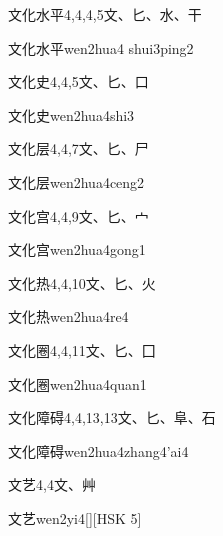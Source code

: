 \begin{entry}{文化水平}{4,4,4,5}{⽂、⼔、⽔、⼲}
  \begin{phonetics}{文化水平}{wen2hua4 shui3ping2}
  \end{phonetics}
\end{entry}

\begin{entry}{文化史}{4,4,5}{⽂、⼔、⼝}
  \begin{phonetics}{文化史}{wen2hua4shi3}
  \end{phonetics}
\end{entry}

\begin{entry}{文化层}{4,4,7}{⽂、⼔、⼫}
  \begin{phonetics}{文化层}{wen2hua4ceng2}
  \end{phonetics}
\end{entry}

\begin{entry}{文化宫}{4,4,9}{⽂、⼔、⼧}
  \begin{phonetics}{文化宫}{wen2hua4gong1}
  \end{phonetics}
\end{entry}

\begin{entry}{文化热}{4,4,10}{⽂、⼔、⽕}
  \begin{phonetics}{文化热}{wen2hua4re4}
  \end{phonetics}
\end{entry}

\begin{entry}{文化圈}{4,4,11}{⽂、⼔、⼞}
  \begin{phonetics}{文化圈}{wen2hua4quan1}
  \end{phonetics}
\end{entry}

\begin{entry}{文化障碍}{4,4,13,13}{⽂、⼔、⾩、⽯}
  \begin{phonetics}{文化障碍}{wen2hua4zhang4'ai4}
  \end{phonetics}
\end{entry}

\begin{entry}{文艺}{4,4}{⽂、⾋}
  \begin{phonetics}{文艺}{wen2yi4}[][HSK 5]
  \end{phonetics}
\end{entry}

